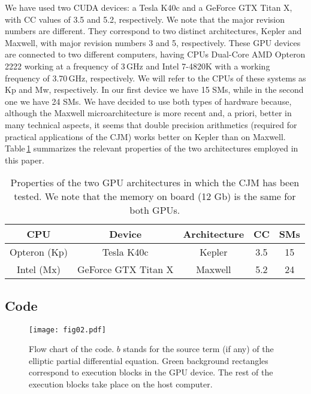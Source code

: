 \documentclass[preprint,12pt]{elsarticle}
\begin{document}
We have used two CUDA devices: a Tesla K40c and a GeForce GTX Titan X,
with CC values of 3.5 and 5.2, respectively. We note that the major
revision numbers are different. They correspond to two distinct
architectures, Kepler and Maxwell, with major revision numbers 3 and
5, respectively. These GPU devices are connected to two different
computers, having CPUs Dual-Core AMD Opteron 2222 working at a
frequency of 3\,GHz and Intel 7-4820K with a working frequency of
3.70\,GHz, respectively. We will refer to the CPUs of these systems as Kp and Mw,
respectively. In our first device we have 15 SMs, while in the second
one we have 24 SMs. We have decided to use both types of hardware
because, although the Maxwell microarchitecture is more recent and, a
priori, better in many technical aspects, it seems that double
precision arithmetics (required for practical applications of the CJM)
works better on Kepler than on
Maxwell. Table\,\mbox{\ref{tab:architectures}} summarizes the relevant
properties of the two architectures employed in this paper.
%
\begin{table}[ht!]
\centering
\begin{tabular}{|c c c c c|} 
\hline
CPU & Device                      &   Architecture &  CC  & SMs \\
\hline 
Opteron (Kp) & Tesla K40c               &   Kepler          &3.5  & 15  \\
Intel (Mx)     & GeForce GTX Titan X &  Maxwell        &5.2   & 24 \\
\hline
\end{tabular}
\caption{Properties of the two GPU architectures in which the CJM has
    been tested. We note that the memory on board (12 Gb) is the same
    for both GPUs.}
\label{tab:architectures}
\end{table}



\subsection{Code}
\label{subsec:code}

\begin{figure*}
\centering
\texttt{[image: fig02.pdf]}
\caption{Flow chart of the code. $b$ stands for the source term (if any) of the elliptic partial differential equation. Green background rectangles correspond to execution blocks in the GPU device. The rest of the execution blocks take place on the host computer.}
\end{figure*}
\end{document}
